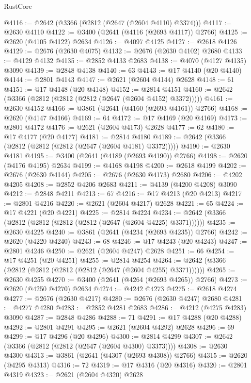 \begin{lexlean}{RustCore}
\begin{coremodule}
@4116 := @2642 (@3366 (@2812 (@2647 (@2604 @4110) @3374)))
@4117 := @2630 @4110
@4122 := @3400 (@2641 (@4116 (@2693 @4117)) @2766)
@4125 := @2620 (@4105 @4122) @2634
@4126 := @4097 @4125
@4127 := @2618 @4126
@4129 := @2676 (@2630 @4075)
@4132 := @2676 (@2630 @4102) @2680
@4133 := @4129 @4132
@4135 := @2852 @4133 @2683
@4138 := @4070 (@4127 @4135) @3090
@4139 := @2848 @4138
@4140 := 63
@4143 := @17 @4140 (@20 @4140)
@4144 := @2801 @4143
@4147 := @2621 (@2604 @4144) @2628
@4148 := 61
@4151 := @17 @4148 (@20 @4148)
@4152 := @2814 @4151
@4160 := @2642 (@3366 (@2812 (@2812 (@2812 (@2647 (@2604 @4152) @3372)))))
@4161 := @2630 @4152
@4166 := @3861 (@2641 (@4160 (@2693 @4161)) @2766)
@4168 := @2620 (@4147 @4166)
@4169 := 64
@4172 := @17 @4169 (@20 @4169)
@4173 := @2801 @4172
@4176 := @2621 (@2604 @4173) @2628
@4177 := 62
@4180 := @17 @4177 (@20 @4177)
@4181 := @2814 @4180
@4189 := @2642 (@3366 (@2812 (@2812 (@2812 (@2647 (@2604 @4181) @3372)))))
@4190 := @2630 @4181
@4195 := @3400 (@2641 (@4189 (@2693 @4190)) @2766)
@4198 := @2620 (@4176 @4195) @2634
@4199 := @4168 @4198
@4200 := @2618 @4199
@4202 := @2676 (@2630 @4144)
@4205 := @2676 (@2630 @4173) @2680
@4206 := @4202 @4205
@4208 := @2852 @4206 @2683
@4211 := @4139 (@4200 @4208) @3090
@4212 := @2848 @4211
@4213 := 67
@4216 := @17 @4213 (@20 @4213)
@4217 := @2801 @4216
@4220 := @2621 (@2604 @4217) @2628
@4221 := 65
@4224 := @17 @4221 (@20 @4221)
@4225 := @2814 @4224
@4234 := @2642 (@3366 (@2812 (@2812 (@2812 (@2812 (@2647 (@2604 @4225) @3371))))))
@4235 := @2630 @4225
@4240 := @3861 (@2641 (@4234 (@2693 @4235)) @2766)
@4242 := @2620 (@4220 @4240)
@4243 := 68
@4246 := @17 @4243 (@20 @4243)
@4247 := @2801 @4246
@4250 := @2621 (@2604 @4247) @2628
@4251 := 66
@4254 := @17 @4251 (@20 @4251)
@4255 := @2814 @4254
@4264 := @2642 (@3366 (@2812 (@2812 (@2812 (@2812 (@2647 (@2604 @4255) @3371))))))
@4265 := @2630 @4255
@4270 := @3400 (@2641 (@4264 (@2693 @4265)) @2766)
@4273 := @2620 (@4250 @4270) @2634
@4274 := @4242 @4273
@4275 := @2618 @4274
@4277 := @2676 (@2630 @4217)
@4280 := @2676 (@2630 @4247) @2680
@4281 := @4277 @4280
@4283 := @2852 @4281 @2683
@4286 := @4212 (@4275 @4283) @3090
@4287 := @2848 @4286
@4288 := 71
@4291 := @17 @4288 (@20 @4288)
@4292 := @2801 @4291
@4295 := @2621 (@2604 @4292) @2628
@4296 := 69
@4299 := @17 @4296 (@20 @4296)
@4300 := @2814 @4299
@4307 := @2642 (@3366 (@2812 (@2812 (@2647 (@2604 @4300) @3373))))
@4308 := @2630 @4300
@4313 := @3861 (@2641 (@4307 (@2693 @4308)) @2766)
@4315 := @2620 (@4295 @4313)
@4316 := 72
@4319 := @17 @4316 (@20 @4316)
@4320 := @2801 @4319
@4323 := @2621 (@2604 @4320) @2628

\end{coremodule}
\end{lexlean}
